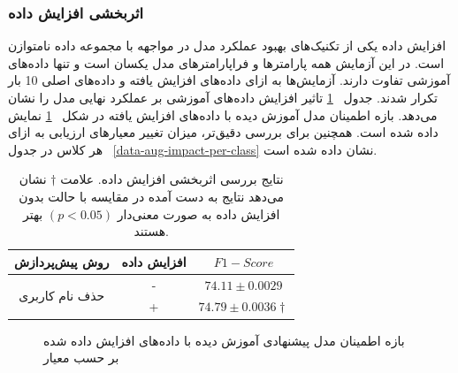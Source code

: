 \subsubsection{اثربخشی افزایش داده} \label{sec:data-aug-impact}
افزایش داده یکی از تکنیک‌های بهبود عملکرد مدل در مواجهه با مجموعه داده نامتوازن است. در این آزمایش همه پارامترها و فراپارامترهای مدل یکسان است و تنها داده‌های آموزشی تفاوت دارند. آزمایش‌ها به ازای داده‌های افزایش یافته و داده‌های اصلی 10 بار تکرار شدند. جدول
~\ref{data-aug-impact-table} 
تاثیر افزایش داده‌های آموزشی بر عملکرد نهایی مدل را نشان می‌دهد. بازه اطمینان مدل آموزش دیده با داده‌های افزایش یافته در شکل
~\ref{data-aug-impact-bar-chart}
نمایش داده شده است. همچنین برای بررسی دقیق‌تر، میزان تغییر معیارهای ارزیابی به ازای هر کلاس در جدول
~\ref{data-aug-impact-per-class}
نشان داده شده است. 
\begin{table}[h!]
	
	\caption[نتایج بررسی اثربخشی افزایش داده. ]
	{\label{data-aug-impact-table}
		نتایج بررسی اثربخشی افزایش داده. علامت $\dagger$ نشان می‌دهد نتایج به دست آمده در مقایسه با حالت بدون افزایش داده به صورت معنی‌دار $(p < 0.05)$ بهتر هستند.}
	\centering
	\vspace{0.2cm}
	\begin{tabular}{c  c |c }
		\hline
		روش پیش‌پردازش&افزایش داده &  $F1-Score$\\
		\hline
		\multirow{2}{*}{حذف نام کاربری}&	-  & $74.11 \pm 0.0029$\\
										&  + & 	$74.79 \pm 0.0036 \dagger$\\
		\hline
		\hline
	\end{tabular}
	
\end{table}

\begin{figure}[H]
	\caption[بازه اطمینان مدل پیشنهادی آموزش دیده با داده‌های افزایش داده‌ شده]{بازه اطمینان مدل پیشنهادی آموزش دیده با داده‌های افزایش داده‌ شده بر حسب معیار
		}
	\label{data-aug-impact-bar-chart}
\end{figure}

